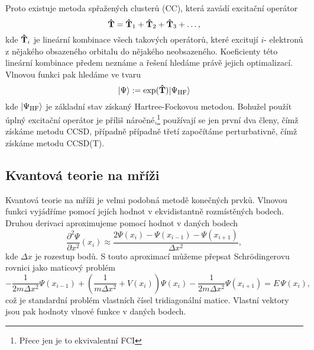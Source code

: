 Proto existuje metoda spřažených clusterů (CC), která zavádí excitační operátor
\begin{equation}
\mathbf{\hat{T}} = \mathbf{\hat{T}}_1 + \mathbf{\hat{T}}_2 + \mathbf{\hat{T}}_3 + \dots,
\end{equation}
kde $\mathbf{\hat{T}}_i$ je lineární kombinace všech takových operátorů, které excitují $i$-
elektronů z nějakého obsazeného orbitalu do nějakého neobsazeného.
Koeficienty této lineární kombinace předem neznáme a řešení hledáme právě
jejich optimalizací.
Vlnovou funkci pak hledáme ve tvaru
\begin{equation}
| \Psi \rangle := \exp(\mathbf{\hat{T}}) | \Psi_\mathrm{HF} \rangle
\end{equation}
kde $| \Psi_\mathrm{HF} \rangle$ je základní stav získaný Hartree-Fockovou metodou.
Bohužel použít úplný excitační operátor je příliš náročné,\footnote{Přece jen je to 
ekvivalentní FCI} používají se jen první dva členy, čímž získáme metodu CCSD, případně 
případně třetí započítáme perturbativně, čímž získáme metodu CCSD(T).

\subsection{Kvantová teorie na mříži}
Kvantová teorie na mříži je velmi podobná metodě konečných prvků.
Vlnovou funkci vyjádříme pomocí jejích hodnot v ekvidistantně rozmístěných bodech.
Druhou derivaci aproximujeme pomocí hodnot v daných bodech
\begin{equation}
\frac{\partial^2 \Psi}{\partial x^2}(x_i) \approx \frac{2\Psi(x_i)-\Psi(x_{i-1})-
\Psi(x_{i+1})}{\Delta x^2},
\end{equation}
kde $\Delta x$ je rozestup bodů.
S touto aproximací můžeme přepsat Schrödingerovu rovnici jako maticový problém
\begin{equation}
-\frac{1}{2m\Delta x^2} \Psi(x_{i-1}) 
+ \left(\frac{1}{m\Delta x^2}+V(x_i)\right) \Psi(x_i)
-\frac{1}{2m\Delta x^2} \Psi(x_{i+1}) = E\,\Psi(x_i),
\end{equation}
což je standardní problém vlastních čísel tridiagonální matice.
Vlastní vektory jsou pak hodnoty vlnové funkce v daných bodech.
